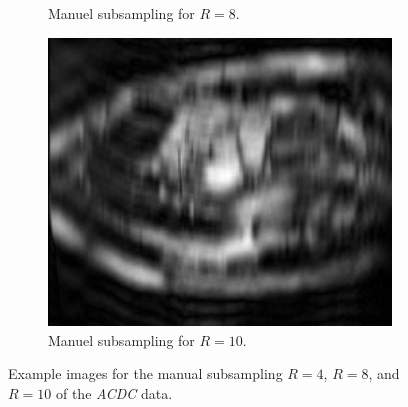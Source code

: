 \begin{figure}[h]
\begin{subfigure}{0.32\textwidth}
    		\caption{Manuel subsampling for $R=8$.}
    		\label{fig:ManualSubsamplingACDC_Mode2}
	\end{subfigure}
	\hfill 
	\begin{subfigure}{0.32\textwidth}
    		\includegraphics[width=\textwidth]{./Images/ManualSubsamplingACDC_Mode3.png}
    		\caption{Manuel subsampling for $R=10$.}
    		\label{fig:ManualSubsamplingACDC_Mode3}
	\end{subfigure}
	\caption{Example images for the manual subsampling $R=4$, $R=8$, and $R=10$ of the \emph{ACDC} data.}
	\label{fig:ManuelSubsampling_ACDC}
\end{figure}


